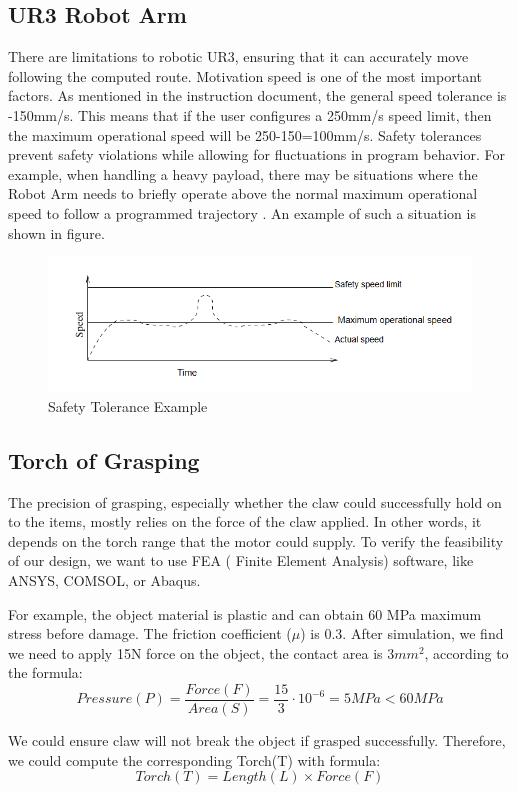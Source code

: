 \documentclass{senior-design-individual}
\begin{document}
\subsection{UR3 Robot Arm}
There are limitations to robotic UR3, ensuring that it can accurately move 
following the computed route. Motivation speed is one of the most important 
factors. As mentioned in the instruction document, the general speed tolerance 
is -150mm/s. This means that if the user conﬁgures a 250mm/s speed limit, then 
the maximum operational speed will be 250-150=100mm/s. Safety tolerances 
prevent safety violations while allowing for ﬂuctuations in program behavior. 
For example, when handling a heavy payload, there may be situations where the 
Robot Arm needs to brieﬂy operate above the normal maximum operational speed to 
follow a programmed trajectory \cite{ur3-manual}. An example of such a situation is shown in 
ﬁgure. 
\begin{figure}[H]
    \centering
    \includegraphics[width=0.8\linewidth]{UR3 Tolerance.png}
    \caption{Safety Tolerance Example}
\end{figure}
\subsection{Torch of Grasping}
The precision of grasping, especially whether the claw could successfully hold 
on to the items, mostly relies on the force of the claw applied. In other words, 
it depends on the torch range that the motor could supply. To verify the 
feasibility of our design, we want to use FEA ( Finite Element Analysis) 
software, like ANSYS, COMSOL, or Abaqus.
 
For example, the object material is plastic and can obtain 60 MPa 
maximum stress before damage. The friction coefficient ($\mu$) is 0.3. After 
simulation, we find we need to apply 15N force on the object, the contact area 
is $3mm^2$, according to the formula: 
\begin{equation*}
    Pressure(P)=\frac{Force(F)}{Area(S)}=\frac{15}{3} \cdot 10^{-6}=5MPa<60MPa 
\end{equation*}

We could ensure claw will not break the object if grasped successfully. Therefore, we could compute the corresponding Torch(T) with formula: 
\begin{equation*}
    Torch(T)=Length(L) \times Force(F)
\end{equation*}
\end{document}
